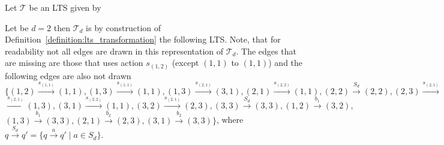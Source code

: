 \begin{example}
    Let $\mathcal{T}$ be an LTS given by
    \begin{center}
    \end{center}
    Let be $d = 2$ then $\mathcal{T}_d$ is by construction of Definition~\ref{definition:lts_transformation} the
    following LTS. Note, that for readability not all edges are drawn in this representation of $\mathcal{T}_d$.
    The edges that are missing are those that uses action $s_{(1, 2)}$ (except $(1, 1)$ to $(1,
    1)$) and the following edges are also not drawn
    $\{(1, 2) \overset{s_{(1, 1)}}{\rightarrow} (1, 1),
    (1, 3) \overset{s_{(1, 1)}}{\rightarrow} (1, 1),
    (1, 3) \overset{s_{(2, 1)}}{\rightarrow} (3, 1),
    (2, 1) \overset{s_{(2, 2)}}{\rightarrow} (1, 1),
    (2, 2) \overset{S_d}{\rightarrow} (2, 2),
    (2, 3) \overset{s_{(2, 1)}}{\rightarrow} (3, 2),
    (3, 1) $ $\overset{s_{(2, 1)}}{\rightarrow} (1, 3),
    (3, 1) \overset{s_{(2, 2)}}{\rightarrow} (1, 1),
    (3, 2) \overset{s_{(2, 1)}}{\rightarrow} (2, 3),
    (3, 3) \overset{S_d}{\rightarrow} (3, 3),
    (1, 2) \overset{b_1}{\rightarrow} (3, 2),
    $ $(1, 3) \overset{b_1}{\rightarrow} (3, 3),
    (2, 1) \overset{b_2}{\rightarrow} (2, 3),
    (3, 1) \overset{b_2}{\rightarrow} (3, 3)
    \}$, where $q \overset{S_d}{\rightarrow} q' =
    \{q \overset{a}{\rightarrow} q' \mid a \in S_d\}$.
    \begin{center}
\end{center}
\end{example}
